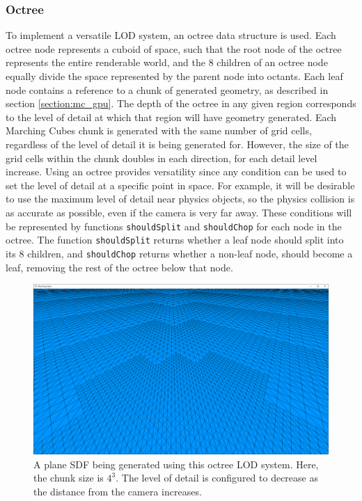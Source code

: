 \documentclass{article}
\begin{document}
\subsubsection{Octree}
\label{section:octree}
To implement a versatile LOD system, an octree data structure is used.
Each octree node represents a cuboid of space, such that the root node of the octree represents the entire renderable world, and the 8 children of an octree node equally divide the space represented by the parent node into octants. Each leaf node contains a reference to a chunk of generated geometry, as described in section \ref{section:mc_gpu}. The depth of the octree in any given region corresponds to the level of detail at which that region will have geometry generated. Each Marching Cubes chunk is generated with the same number of grid cells, regardless of the level of detail it is being generated for. However, the size of the grid cells within the chunk doubles in each direction, for each detail level increase. Using an octree provides versatility since any condition can be used to set the level of detail at a specific point in space. For example, it will be desirable to use the maximum level of detail near physics objects, so the physics collision is as accurate as possible, even if the camera is very far away. These conditions will be represented by functions \texttt{shouldSplit} and \texttt{shouldChop} for each node in the octree. The function \texttt{shouldSplit} returns whether a leaf node should split into its 8 children, and \texttt{shouldChop} returns whether a non-leaf node, should become a leaf, removing the rest of the octree below that node.

\begin{figure}[H]
  \includegraphics[width=\textwidth]{octree_plane.png}
  \caption{A plane SDF being generated using this octree LOD system. Here, the chunk size is $4^3$. The level of detail is configured to decrease as the distance from the camera increases.}
\end{figure}
\end{document}
